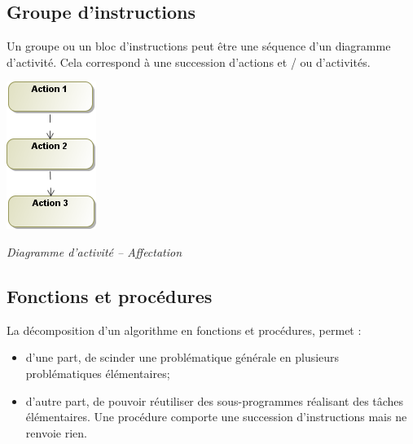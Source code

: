 \documentclass[10pt]{article}
\begin{document}
\subsection{Groupe d'instructions}
\begin{minipage}[c]{.68\linewidth}
Un groupe ou un bloc d’instructions peut être une séquence d’un diagramme
d’activité. Cela correspond à une succession d’actions et / ou d’activités.
\end{minipage} \hfill
\begin{minipage}[c]{.3\linewidth}
\begin{center}
\includegraphics[width=.5\textwidth]{images/Groupe_act}

\textit{Diagramme d'activité -- Affectation}
\end{center}
\end{minipage}


\subsection{Fonctions et procédures}
La décomposition d’un algorithme en fonctions et procédures, permet :
\begin{itemize}
\item d’une part, de scinder une problématique générale en plusieurs problématiques
élémentaires;
\item d’autre part, de pouvoir réutiliser des sous-programmes réalisant des tâches élémentaires.
Une procédure comporte une succession d’instructions mais ne renvoie rien.
\end{itemize}
\end{document}
